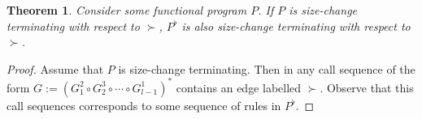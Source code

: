 \documentclass{article}
\newtheorem{theorem}{Theorem}%
\newtheorem{lemma}[theorem]{Lemma}
\theoremstyle{definition}
\renewcommand\em{\bfseries}
\begin{document}

\begin{theorem}
    Consider some functional program $P$. If $P$ is size-change terminating with respect to $\succ$, $P^\flat$ is also size-change terminating with respect to $\succ$.
\end{theorem}
\begin{proof}
    Assume that $P$ is size-change terminating. Then in any call sequence of the form $G := (G_1^2 \circ G_2^3 \circ \cdots \circ G_{l-1}^1)^*$ contains an edge labelled $\succ$. Observe that this call sequences corresponds to some sequence of rules in $P^\flat$.  
\end{proof}




\renewcommand\em{\it}
\printbibliography[title={References}]
\end{document}
